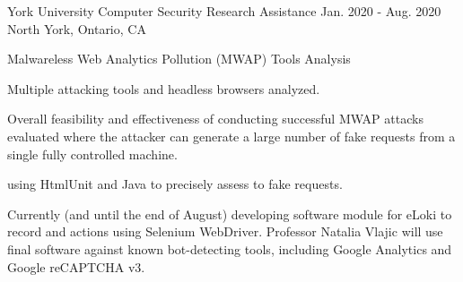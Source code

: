 

\begin{cventries}

  \cventry
    {York University} %
    {Computer Security Research Assistance} %
    {Jan. 2020 - Aug. 2020} %
    {North York, Ontario, CA} %
    {
      \begin{cvitems} %
        \item {Malwareless Web Analytics Pollution (MWAP) Tools Analysis}
          \begin{cvsubitems}
            \item {Multiple attacking tools and headless browsers analyzed.}
            \item {Overall feasibility and effectiveness of conducting successful MWAP attacks evaluated where the attacker can generate a large number of fake requests from a single fully controlled machine.}
            \item { using HtmlUnit and Java to precisely assess  to fake requests.}
            \item {Currently (and until the end of August) developing software module for eLoki to record  and actions using Selenium WebDriver. Professor Natalia Vlajic will use final software against known bot-detecting tools, including Google Analytics and Google reCAPTCHA v3.}
          \end{cvsubitems}
      \end{cvitems}
    }


\end{cventries}
